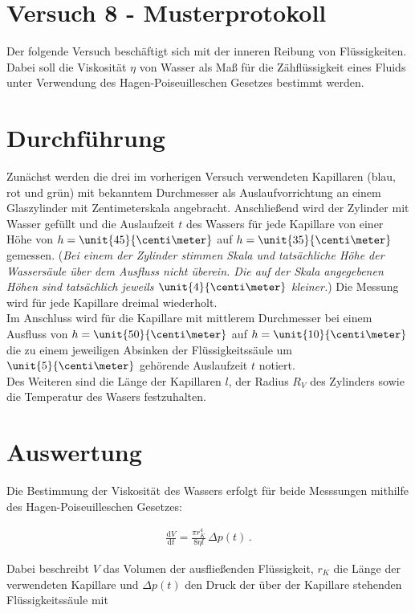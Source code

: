 \section*{Versuch 8 - Musterprotokoll}
\label{sec:einleitung}

Der folgende Versuch beschäftigt sich mit der inneren Reibung von Flüssigkeiten. Dabei soll die Viskosität $\eta$ von Wasser als Maß für die Zähflüssigkeit eines Fluids unter Verwendung des Hagen-Poiseuilleschen Gesetzes bestimmt werden.

\section{Durchführung}
\label{sec:durchfuehrung}

Zunächst werden die drei im vorherigen Versuch verwendeten Kapillaren (blau, rot und grün) mit bekanntem Durchmesser als Auslaufvorrichtung an einem Glaszylinder mit Zentimeterskala angebracht. Anschließend wird der Zylinder mit Wasser gefüllt und die Auslaufzeit $t$ des Wassers für jede Kapillare von einer Höhe von $h=\unit{45}{\centi\meter}$ auf $h=\unit{35}{\centi\meter}$ gemessen. (\textit{Bei einem der Zylinder stimmen Skala und tatsächliche Höhe der Wassersäule über dem Ausfluss nicht überein. Die auf der Skala angegebenen Höhen sind tatsächlich jeweils $\unit{4}{\centi\meter}$ kleiner.}) Die Messung wird für jede Kapillare dreimal wiederholt.\\
Im Anschluss wird für die Kapillare mit mittlerem Durchmesser bei einem Ausfluss von $h=\unit{50}{\centi\meter}$ auf $h=\unit{10}{\centi\meter}$ die zu einem jeweiligen Absinken der Flüssigkeitssäule um $\unit{5}{\centi\meter}$ gehörende Auslaufzeit $t$ notiert.\\
Des Weiteren sind die Länge der Kapillaren $l$, der Radius $R_V$ des Zylinders sowie die Temperatur des Wasers festzuhalten.

\section{Auswertung}
\label{sec:auswertung}

Die Bestimmung der Viskosität des Wassers erfolgt für beide Messsungen mithilfe des Hagen-Poiseuilleschen Gesetzes:

\begin{align}
\frac{\text{d}V}{\text{d}t} = \frac{\pi r_K^4}{8\eta l}\,\Delta p(t)\,\label{eq:H-P} .
\end{align}

\noindent Dabei beschreibt $V$ das Volumen der ausfließenden Flüssigkeit, $r_K$ die Länge der verwendeten Kapillare und $\Delta p(t)$ den Druck der über der Kapillare stehenden Flüssigkeitssäule mit

